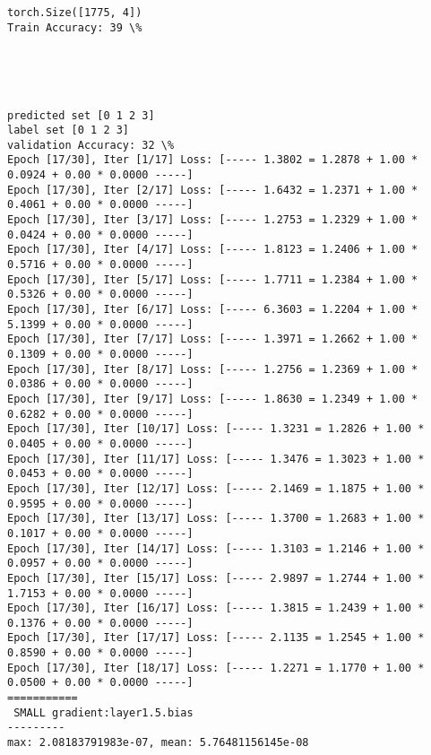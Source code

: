 \documentclass[11pt]{article}
\begin{document}
    \begin{Verbatim}[commandchars=\\\{\}]
torch.Size([1775, 4])
Train Accuracy: 39 \%

    \end{Verbatim}

    \begin{center}
    \end{center}
    { \hspace*{\fill} \\}
    
    \begin{center}
    \end{center}
    { \hspace*{\fill} \\}
    
    \begin{Verbatim}[commandchars=\\\{\}]
predicted set [0 1 2 3]
label set [0 1 2 3]
validation Accuracy: 32 \%
Epoch [17/30], Iter [1/17] Loss: [----- 1.3802 = 1.2878 + 1.00 * 0.0924 + 0.00 * 0.0000 -----]
Epoch [17/30], Iter [2/17] Loss: [----- 1.6432 = 1.2371 + 1.00 * 0.4061 + 0.00 * 0.0000 -----]
Epoch [17/30], Iter [3/17] Loss: [----- 1.2753 = 1.2329 + 1.00 * 0.0424 + 0.00 * 0.0000 -----]
Epoch [17/30], Iter [4/17] Loss: [----- 1.8123 = 1.2406 + 1.00 * 0.5716 + 0.00 * 0.0000 -----]
Epoch [17/30], Iter [5/17] Loss: [----- 1.7711 = 1.2384 + 1.00 * 0.5326 + 0.00 * 0.0000 -----]
Epoch [17/30], Iter [6/17] Loss: [----- 6.3603 = 1.2204 + 1.00 * 5.1399 + 0.00 * 0.0000 -----]
Epoch [17/30], Iter [7/17] Loss: [----- 1.3971 = 1.2662 + 1.00 * 0.1309 + 0.00 * 0.0000 -----]
Epoch [17/30], Iter [8/17] Loss: [----- 1.2756 = 1.2369 + 1.00 * 0.0386 + 0.00 * 0.0000 -----]
Epoch [17/30], Iter [9/17] Loss: [----- 1.8630 = 1.2349 + 1.00 * 0.6282 + 0.00 * 0.0000 -----]
Epoch [17/30], Iter [10/17] Loss: [----- 1.3231 = 1.2826 + 1.00 * 0.0405 + 0.00 * 0.0000 -----]
Epoch [17/30], Iter [11/17] Loss: [----- 1.3476 = 1.3023 + 1.00 * 0.0453 + 0.00 * 0.0000 -----]
Epoch [17/30], Iter [12/17] Loss: [----- 2.1469 = 1.1875 + 1.00 * 0.9595 + 0.00 * 0.0000 -----]
Epoch [17/30], Iter [13/17] Loss: [----- 1.3700 = 1.2683 + 1.00 * 0.1017 + 0.00 * 0.0000 -----]
Epoch [17/30], Iter [14/17] Loss: [----- 1.3103 = 1.2146 + 1.00 * 0.0957 + 0.00 * 0.0000 -----]
Epoch [17/30], Iter [15/17] Loss: [----- 2.9897 = 1.2744 + 1.00 * 1.7153 + 0.00 * 0.0000 -----]
Epoch [17/30], Iter [16/17] Loss: [----- 1.3815 = 1.2439 + 1.00 * 0.1376 + 0.00 * 0.0000 -----]
Epoch [17/30], Iter [17/17] Loss: [----- 2.1135 = 1.2545 + 1.00 * 0.8590 + 0.00 * 0.0000 -----]
Epoch [17/30], Iter [18/17] Loss: [----- 1.2271 = 1.1770 + 1.00 * 0.0500 + 0.00 * 0.0000 -----]
===========
 SMALL gradient:layer1.5.bias
---------
max: 2.08183791983e-07, mean: 5.76481156145e-08

    \end{Verbatim}
\end{document}
